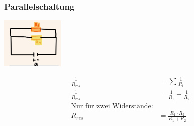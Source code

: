     \subsubsection*{Parallelschaltung}
    \vspace{-1mm}
    \begin{minipage}{0.49\linewidth}
        \begin{footnotesize}
            \begin{center}
                \vspace{2mm}
                \includegraphics[width = 30mm]{src/images/parallelschaltung.png}
            \end{center}
        \end{footnotesize}
    \end{minipage}
    \begin{minipage}{0.5\linewidth}
        \begin{scriptsize}
            \begin{center}
                \begin{align*}
                    \frac{1}{R_{res}} &= \sum \frac{1}{R_i}
                    \\\frac{1}{R_{res}} &= \frac{1}{R_1} +\frac{1}{R_2}
                    \\\text{Nur für zwei Widerstände:}
                    \\R_{res} &= \frac{R_1 \cdot R_2}{R_1 + R_2}
                \end{align*}
            \end{center}
        \end{scriptsize}
    \end{minipage}
    \vspace{1mm}